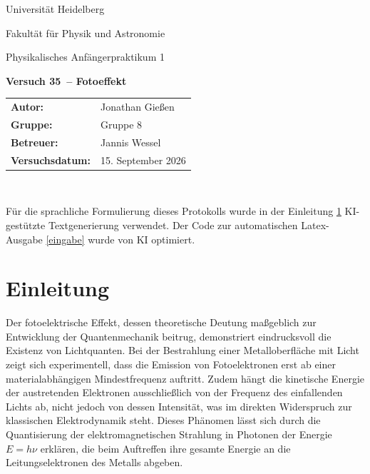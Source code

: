 \documentclass[12pt,a4paper,titlepage]{scrartcl}
\numberwithin{equation}{section}
\numberwithin{table}{section}
\numberwithin{figure}{section}
\newcommand{\versuch}{Versuch 35}
\newcommand{\titel}{Fotoeffekt}
\newcommand{\praktikum}{Physikalisches Anfängerpraktikum 1}
\newcommand{\autor}{Jonathan Gießen}
\newcommand{\gruppe}{Gruppe 8}
\newcommand{\datum}{15. September 2026}
\newcommand{\betreuer}{Jannis Wessel}
\begin{document}
\pagestyle{scrheadings}

\begin{titlepage}



    \centering
    \vspace*{4cm}
    {\large Universität Heidelberg\par}
    {\small Fakultät für Physik und Astronomie\par}
    {\Large \praktikum\par}
    \vspace{0.8cm}
    {\LARGE \bfseries \versuch\ -- \titel\par}
    \vspace{1.5cm}

    \begin{tabular}{ll}
        \textbf{Autor:} & \autor\\
        \textbf{Gruppe:} & \gruppe\\
        \textbf{Betreuer:} & \betreuer\\
        \textbf{Versuchsdatum:} & \datum\\
    \end{tabular}

    \vfill
    \hrulefill\
\end{titlepage}

\tableofcontents

\bigskip
\begin{tcolorbox}[colback=gray!5,colframe=gray!60,boxrule=0.8pt,arc=0.01mm,title=KI-Hinweis]
    Für die sprachliche Formulierung dieses Protokolls wurde in der Einleitung \ref{sec:Einleitung} KI-gestützte Textgenerierung verwendet. Der Code zur automatischen Latex-Ausgabe \ref{eingabe} wurde von KI optimiert.
\end{tcolorbox}

\clearpage


\section{Einleitung}\label{sec:Einleitung}
Der fotoelektrische Effekt, dessen theoretische Deutung maßgeblich zur Entwicklung der Quantenmechanik beitrug, demonstriert eindrucksvoll die Existenz von Lichtquanten. Bei der Bestrahlung einer Metalloberfläche mit Licht zeigt sich experimentell, dass die Emission von Fotoelektronen erst ab einer materialabhängigen Mindestfrequenz auftritt. Zudem hängt die kinetische Energie der austretenden Elektronen ausschließlich von der Frequenz des einfallenden Lichts ab, nicht jedoch von dessen Intensität, was im direkten Widerspruch zur klassischen Elektrodynamik steht. Dieses Phänomen lässt sich durch die Quantisierung der elektromagnetischen Strahlung in Photonen der Energie $E = h\nu$ erklären, die beim Auftreffen ihre gesamte Energie an die Leitungselektronen des Metalls abgeben.  
\end{document}
